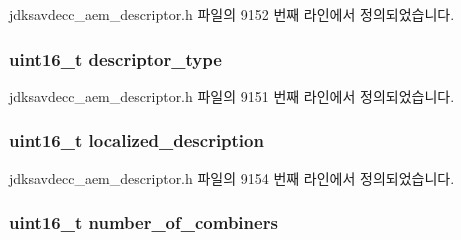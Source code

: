 jdksavdecc\+\_\+aem\+\_\+descriptor.\+h 파일의 9152 번째 라인에서 정의되었습니다.

\subsubsection[{\texorpdfstring{descriptor\+\_\+type}{descriptor_type}}]{\setlength{\rightskip}{0pt plus 5cm}uint16\+\_\+t descriptor\+\_\+type}\hypertarget{structjdksavdecc__descriptor__video__unit_ab7c32b6c7131c13d4ea3b7ee2f09b78d}{}\label{structjdksavdecc__descriptor__video__unit_ab7c32b6c7131c13d4ea3b7ee2f09b78d}


jdksavdecc\+\_\+aem\+\_\+descriptor.\+h 파일의 9151 번째 라인에서 정의되었습니다.

\subsubsection[{\texorpdfstring{localized\+\_\+description}{localized_description}}]{\setlength{\rightskip}{0pt plus 5cm}uint16\+\_\+t localized\+\_\+description}\hypertarget{structjdksavdecc__descriptor__video__unit_a0926f846ca65a83ad5bb06b4aff8f408}{}\label{structjdksavdecc__descriptor__video__unit_a0926f846ca65a83ad5bb06b4aff8f408}


jdksavdecc\+\_\+aem\+\_\+descriptor.\+h 파일의 9154 번째 라인에서 정의되었습니다.

\subsubsection[{\texorpdfstring{number\+\_\+of\+\_\+combiners}{number_of_combiners}}]{\setlength{\rightskip}{0pt plus 5cm}uint16\+\_\+t number\+\_\+of\+\_\+combiners}\hypertarget{structjdksavdecc__descriptor__video__unit_afbc32f9432e80e58a019b1be2388cf66}{}\label{structjdksavdecc__descriptor__video__unit_afbc32f9432e80e58a019b1be2388cf66}


